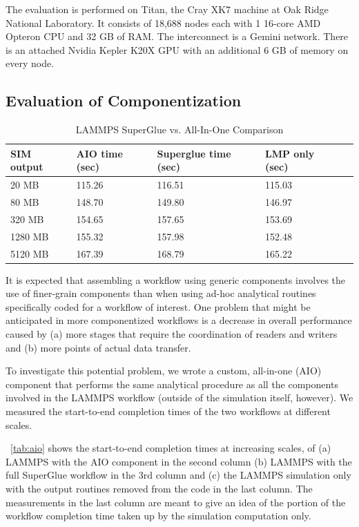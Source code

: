 The evaluation is performed on Titan, the Cray XK7 machine at Oak Ridge
National Laboratory. It consists of 18,688 nodes each with 1 16-core AMD
Opteron CPU and 32 GB of RAM. The interconnect is a Gemini network. There is an
attached Nvidia Kepler K20X GPU with an additional 6 GB of memory on every
node.

\subsection{Evaluation of Componentization}

\begin{table}[tbp]
  \centering
  \caption{LAMMPS SuperGlue vs. All-In-One Comparison}
  \label{tab:aio}
  \vspace{-0.07in}
  \begin{tabular}{|l|l|l|l|l|}
    \hline
    SIM output & AIO time (sec) & Superglue time (sec) & LMP only (sec) \\
    \hline
    20 MB & 115.26 & 116.51 & 115.03\\
    \hline
    80 MB & 148.70 & 149.80 & 146.97\\
    \hline
    320 MB & 154.65 & 157.65 & 153.69\\
    \hline
    1280 MB & 155.32 & 157.98 & 152.48\\
    \hline
    5120 MB & 167.39 & 168.79 & 165.22\\
    \hline
  \end{tabular}
  \vspace{-0.15in}
\end{table}

It is expected that assembling a workflow
using generic components involves the use
of finer-grain components
than when using ad-hoc analytical routines
specifically coded
for a workflow of interest.
One problem that might be anticipated
in more componentized workflows
is a decrease in overall performance caused by
(a) more stages that require the coordination
of readers and writers
and (b) more points of actual data transfer.

To investigate this potential problem,
we wrote a custom, all-in-one (AIO) component
that performs the same analytical procedure
as all the components involved in the LAMMPS workflow
(outside of the simulation itself, however).
We measured
the start-to-end completion times of the two workflows 
at different scales.

~\autoref{tab:aio} shows the start-to-end
completion times
at increasing scales, of
(a) LAMMPS with the AIO component
in the second column
(b) LAMMPS with the full SuperGlue workflow in the 3rd column
and (c) the LAMMPS simulation only with the output routines
removed from the code in the last column.
The measurements in the last column
are meant to give an idea of the portion
of the workflow completion time taken up by the simulation
computation only.

